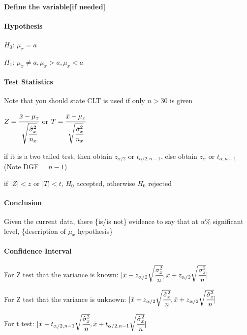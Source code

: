 \documentclass[]{article}
\let\oldparagraph\paragraph
\renewcommand{\paragraph}[1]{\oldparagraph{#1}\mbox{}}
\begin{document}
\paragraph{Define the variable{[}if needed{]}}\label{header-n170}

\paragraph{Hypothesis}\label{header-n171}

\(H_0\): \(\mu_x = a\)

\(H_1\): \(\mu_x \ne a, \mu_x > a, \mu_x < a\)

\paragraph{Test Statistics}\label{header-n174}

Note that you should state CLT is used if only \(n>30\) is given

\(Z = \cfrac{\bar{x} - \mu_x}{\sqrt{\cfrac{\hat{\sigma}^2_x}{n_x}}}\) or
\(T = \cfrac{\bar{x} - \mu_x}{\sqrt{\cfrac{\hat{\sigma}^2_x}{n_x}}}\)

if it is a two tailed test, then obtain \(z_{\alpha/2}\) or
\(t_{\alpha/2 , n-1}\), else obtain \(z_{\alpha}\) or
\(t_{\alpha, n-1}\)(Note DGF = \(n-1\))

if \(|Z| < z\) or \(|T| < t\), \(H_0\) accepted, otherwise \(H_0\)
rejected

\paragraph{Conclusion}\label{header-n179}

Given the current data, there \{is/is not\} evidence to say that at
\(\alpha\)\% significant level, \{description of \(\mu_x\) hypothesis\}

\paragraph{Confidence Interval}\label{header-n181}

For Z test that the variance is known:
\([\bar{x} - z_{\alpha/2}\sqrt{\cfrac{\sigma^2_x}{n}} , \bar{x} + z_{\alpha/2}\sqrt{\cfrac{\sigma^2_x}{n}}]\)

For Z test that the variance is unknown:
\([\bar{x} - z_{\alpha/2}\sqrt{\cfrac{\hat{\sigma}^2_x}{n}},\bar{x} + z_{\alpha/2}\sqrt{\cfrac{\hat{\sigma}^2_x}{n}}]\)

For t test:
\([\bar{x} - t_{\alpha/2,n-1}\sqrt{\cfrac{\hat{\sigma}^2_x}{n}},\bar{x} + t_{\alpha/2,n-1}\sqrt{\cfrac{\hat{\sigma}^2_x}{n}}]\)
\end{document}
